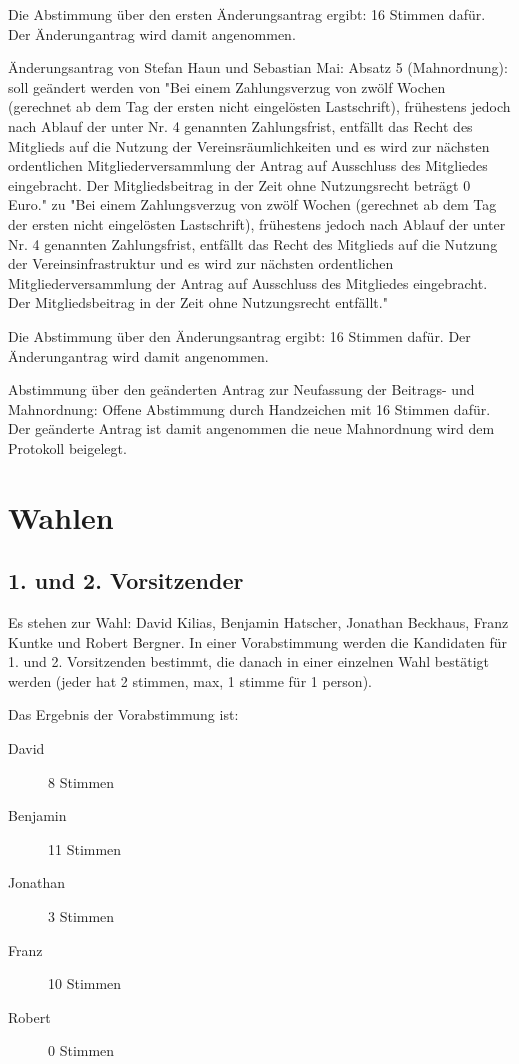 \documentclass[a4paper,12pt,titlepage]{scrartcl}
\begin{document}
Die Abstimmung über den ersten Änderungsantrag ergibt: 16 Stimmen dafür. Der Änderungantrag wird damit angenommen.

Änderungsantrag von Stefan Haun und Sebastian Mai: 
Absatz 5 (Mahnordnung): soll geändert werden von 
"Bei einem Zahlungsverzug von zwölf Wochen (gerechnet ab dem Tag der ersten nicht
eingelösten Lastschrift), frühestens jedoch nach Ablauf der unter Nr. 4 genannten
Zahlungsfrist, entfällt das Recht des Mitglieds auf die Nutzung der
Vereinsräumlichkeiten und es wird zur nächsten ordentlichen Mitgliederversammlung
der Antrag auf Ausschluss des Mitgliedes eingebracht. Der Mitgliedsbeitrag in der Zeit
ohne Nutzungsrecht beträgt 0 Euro." zu 
"Bei einem Zahlungsverzug von zwölf Wochen (gerechnet ab dem Tag der ersten nicht
eingelösten Lastschrift), frühestens jedoch nach Ablauf der unter Nr. 4 genannten
Zahlungsfrist, entfällt das Recht des Mitglieds auf die Nutzung der
Vereinsinfrastruktur und es wird zur nächsten ordentlichen Mitgliederversammlung
der Antrag auf Ausschluss des Mitgliedes eingebracht. Der Mitgliedsbeitrag in der Zeit ohne Nutzungsrecht entfällt."


Die Abstimmung über den Änderungsantrag ergibt: 16 Stimmen dafür. Der Änderungantrag wird damit angenommen.


Abstimmung über den geänderten Antrag zur Neufassung der Beitrags- und Mahnordnung: Offene Abstimmung durch Handzeichen mit 16 Stimmen dafür. Der geänderte Antrag ist damit angenommen die neue Mahnordnung wird dem Protokoll beigelegt.


\section{Wahlen}

\subsection{ 1. und 2. Vorsitzender }
Es stehen zur Wahl: David Kilias, Benjamin Hatscher, Jonathan Beckhaus, Franz Kuntke und Robert Bergner. In einer Vorabstimmung werden die Kandidaten für 1. und 2. Vorsitzenden bestimmt, die danach in einer einzelnen Wahl bestätigt werden (jeder hat 2 stimmen, max, 1 stimme für 1 person).

Das Ergebnis der Vorabstimmung ist: 
\begin{description}
	\item[David] 8 Stimmen
	\item[Benjamin] 11 Stimmen
	\item[Jonathan] 3 Stimmen
	\item[Franz] 10 Stimmen
	\item[Robert] 0 Stimmen
\end{description}
    
\end{document}
